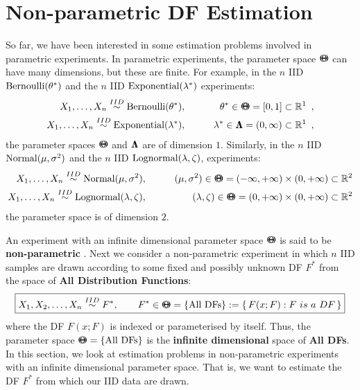 \chapter{Non-parametric DF Estimation}
So far, we have been interested in some estimation problems involved in parametric experiments.  In parametric experiments, the parameter space ${\Theta}\mspace{-11 mu}{\Theta}$ can have many dimensions, but these are finite.  For example, in the $n$ IID $\mbox{{\rm Bernoulli}}(\theta^*)$ and the $n$ IID $\mbox{{\rm Exponential}}(\lambda^*)$ experiments:
\begin{eqnarray*}
X_1,\ldots,X_n \overset{IID}{\sim} \mbox{{\rm Bernoulli}}(\theta^*), & \qquad & \theta^* \in {\Theta}\mspace{-11 mu}{\Theta}=[0,1] \subset \mathbb{R}^1 \enspace , \\
X_1,\ldots,X_n \overset{IID}{\sim} \mbox{{\rm Exponential}}(\lambda^*), & \qquad & \lambda^* \in {\Lambda}\mspace{-11 mu}{\Lambda}=(0,\infty) \subset \mathbb{R}^1 \enspace ,
\end{eqnarray*}
the parameter spaces ${\Theta}\mspace{-11 mu}{\Theta}$ and ${\Lambda}\mspace{-11 mu}{\Lambda}$ are of dimension $1$.  Similarly, in the $n$ IID $\mbox{{\rm Normal}}(\mu,{\sigma}^2)$ and the $n$ IID $\mbox{{\rm Lognormal}}(\lambda,\zeta)$, experiments:
\begin{eqnarray*}
X_1,\ldots,X_n \overset{IID}{\sim} \mbox{{\rm Normal}}(\mu,\sigma^2), &\qquad & (\mu,\sigma^2) \in {\Theta}\mspace{-11 mu}{\Theta}=(-\infty,+\infty) \times (0,+\infty) \subset \mathbb{R}^2 \\
X_1,\ldots,X_n \overset{IID}{\sim} \mbox{{\rm Lognormal}}(\lambda,\zeta), &\qquad & (\lambda,\zeta) \in {\Theta}\mspace{-11 mu}{\Theta}=(0,+\infty) \times (0,+\infty) \subset \mathbb{R}^2 
\end{eqnarray*}
the parameter space is of dimension $2$.

An experiment with an infinite dimensional parameter space ${\Theta}\mspace{-11 mu}{\Theta}$ is said to be {\bf non-parametric} .  Next we consider a non-parametric experiment in which $n$ IID samples are drawn according to some fixed and possibly unknown DF $F^*$ from the space of {\bf All Distribution Functions}:
\[
\boxed{
X_1,X_2,\ldots,X_n \overset{IID}{\sim} F^*, \qquad F^* \in {\Theta}\mspace{-11 mu}{\Theta} = \{ \text{All DFs}\} := \{ \,  F(x; F) :  F~is~a~DF \, \} 
}
\]
where the DF $F(x; F)$ is indexed or parameterised by itself. Thus, the parameter space ${\Theta}\mspace{-11 mu}{\Theta}=\{ \text{All DFs}\}$ is the {\bf infinite dimensional} space of {\bf All DFs}.  In this section, we look at estimation problems in non-parametric experiments with an infinite dimensional parameter space.  That is, we want to estimate the DF $F^*$ from which our IID data are drawn.

